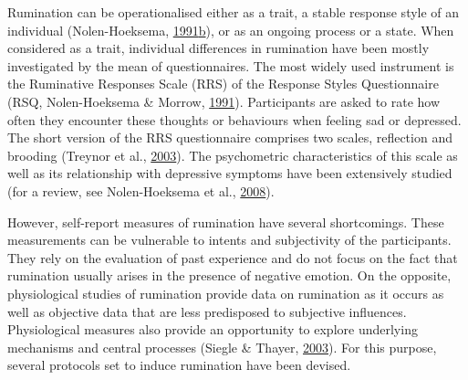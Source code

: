 \documentclass[a4paper,12pt,twoside,openright,oldfontcommands]{memoir}
\begin{document}
Rumination can be operationalised either as a trait, a stable response style of an individual (Nolen-Hoeksema, \protect\hyperlink{ref-Nolen-Hoeksema1991}{1991}\protect\hyperlink{ref-Nolen-Hoeksema1991}{b}), or as an ongoing process or a state. When considered as a trait, individual differences in rumination have been mostly investigated by the mean of questionnaires. The most widely used instrument is the Ruminative Responses Scale (RRS) of the Response Styles Questionnaire (RSQ, Nolen-Hoeksema \& Morrow, \protect\hyperlink{ref-nolen-hoeksema_prospective_1991}{1991}). Participants are asked to rate how often they encounter these thoughts or behaviours when feeling sad or depressed. The short version of the RRS questionnaire comprises two scales, reflection and brooding (Treynor et al., \protect\hyperlink{ref-treynor_rumination_2003}{2003}). The psychometric characteristics of this scale as well as its relationship with depressive symptoms have been extensively studied (for a review, see Nolen-Hoeksema et al., \protect\hyperlink{ref-Nolen-Hoeksema2008}{2008}).

However, self-report measures of rumination have several shortcomings. These measurements can be vulnerable to intents and subjectivity of the participants. They rely on the evaluation of past experience and do not focus on the fact that rumination usually arises in the presence of negative emotion. On the opposite, physiological studies of rumination provide data on rumination as it occurs as well as objective data that are less predisposed to subjective influences. Physiological measures also provide an opportunity to explore underlying mechanisms and central processes (Siegle \& Thayer, \protect\hyperlink{ref-papageorgiou_physiological_2003}{2003}). For this purpose, several protocols set to induce rumination have been devised.
\end{document}
